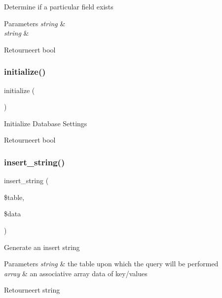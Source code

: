 Determine if a particular field exists


\begin{DoxyParams}{Parameters}
{\em string} & \\
\hline
{\em string} & \\
\hline
\end{DoxyParams}
\begin{DoxyReturn}{Retourneert}
bool 
\end{DoxyReturn}
\mbox{\label{class_c_i___d_b__driver_a91098fa7d1917ce4833f284bbef12627}} 
\subsubsection{\texorpdfstring{initialize()}{initialize()}}
{\footnotesize\ttfamily initialize (\begin{DoxyParamCaption}{ }\end{DoxyParamCaption})}

Initialize Database Settings

\begin{DoxyReturn}{Retourneert}
bool 
\end{DoxyReturn}
\mbox{\label{class_c_i___d_b__driver_ad27720d886add2c9abf9ac48a9ff56d5}} 
\subsubsection{\texorpdfstring{insert\_string()}{insert\_string()}}
{\footnotesize\ttfamily insert\+\_\+string (\begin{DoxyParamCaption}\item[{}]{\$table,  }\item[{}]{\$data }\end{DoxyParamCaption})}

Generate an insert string


\begin{DoxyParams}{Parameters}
{\em string} & the table upon which the query will be performed \\
\hline
{\em array} & an associative array data of key/values \\
\hline
\end{DoxyParams}
\begin{DoxyReturn}{Retourneert}
string 
\end{DoxyReturn}
\mbox{\label{class_c_i___d_b__driver_af435df5703c238769d6d16fde6d51182}} 

